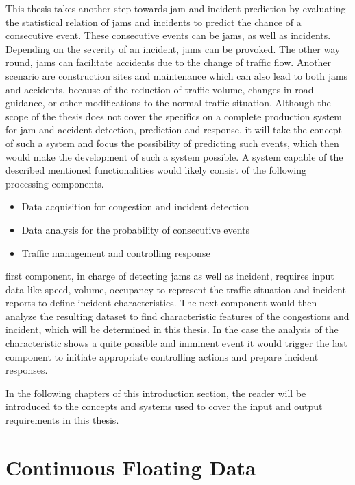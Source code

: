 \documentclass[a4paper,12pt]{report}
\begin{document}
\bigskip

This thesis takes another step towards \gls{jam} and incident prediction by evaluating the statistical relation of \glspl{jam} and incidents to predict the chance of a consecutive event. These consecutive events can be \glspl{jam}, as well as incidents. Depending on the severity of an incident, \glspl{jam} can be provoked. The other way round, \glspl{jam} can facilitate accidents due to the change of traffic flow. Another scenario are construction sites and maintenance which can also lead to both \glspl{jam} and accidents, because of the reduction of traffic volume, changes in road guidance, or other modifications to the normal traffic situation. Although the scope of the thesis does not cover the specifics on a complete production system for \gls{jam} and accident detection, prediction and response, it will take the concept of such a system and focus the possibility of predicting such events, which then would make the development of such a system possible. 
A system capable of the described mentioned functionalities would likely consist of the following processing components.

\begin{itemize}
  \item Data acquisition for congestion and incident detection
  \item Data analysis for the probability of consecutive events
  \item Traffic management and controlling response
\end{itemize}

\The first component, in charge of detecting \glspl{jam} as well as incident, requires input data like speed, volume, occupancy to represent the traffic situation and incident reports to define incident characteristics. The next component would then analyze the resulting dataset to find characteristic features of the congestions and incident, which will be determined in this thesis. In the case the analysis of the characteristic shows a quite possible and imminent event it would trigger the last component to initiate appropriate controlling actions and prepare incident responses.

In the following chapters of this introduction section, the reader will be introduced to the concepts and systems used to cover the input and output requirements in this thesis.

\section{Continuous Floating Data}
\end{document}
